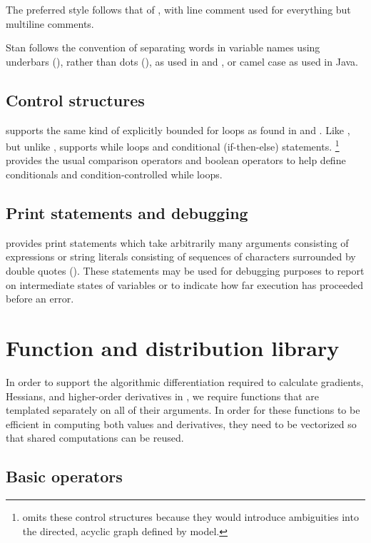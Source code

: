 \documentclass[article]{jss}
\begin{document}
The preferred style follows that of , with line comment
used for everything but multiline comments.  

Stan follows the  convention of separating words in
variable names using underbars (\code{\_}), rather than dots
(), as used in  and , or camel case
as used in Java.

\subsection{Control structures}

 supports the same kind of explicitly bounded for loops
as found in  and .  Like , but unlike
,  supports while loops and conditional
(if-then-else) statements.%
%
\footnote{ omits these control structures because they
  would introduce ambiguities into the directed, acyclic graph defined
  by model.}
%
 provides the usual comparison operators and boolean
operators to help define conditionals and condition-controlled while
loops.  

\subsection{Print statements and debugging}

 provides print statements which take arbitrarily many
arguments consisting of expressions or string literals consisting of
sequences of characters surrounded by double quotes ().
These statements may be used for debugging purposes to report on
intermediate states of variables or to indicate how far execution has
proceeded before an error.

\section{Function and distribution library}

In order to support the algorithmic differentiation required to
calculate gradients, Hessians, and higher-order derivatives in
, we require  functions that are 
templated separately on all of their arguments.  In order for these
functions to be efficient in computing both values and derivatives,
they need to be vectorized so that shared computations can be reused.

\subsection{Basic operators}
\end{document}
